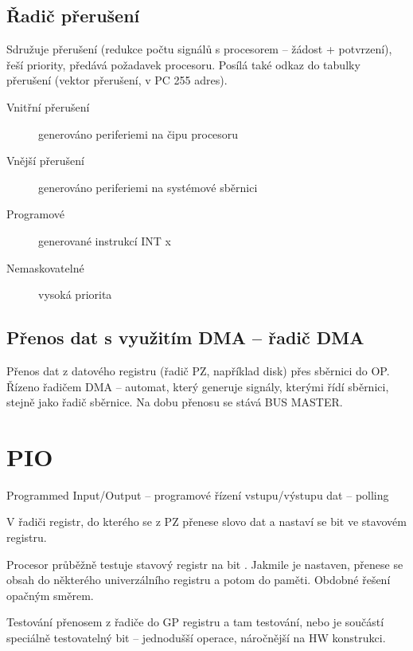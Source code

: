 \documentclass[a4paper, 11pt]{report}
\begin{document}
\subsection{Řadič přerušení}

Sdružuje přerušení (redukce počtu signálů s procesorem -- žádost + potvrzení), řeší priority, předává požadavek procesoru. Posílá také odkaz do tabulky přerušení (vektor přerušení, v PC 255 adres).

\begin{description}
	\item[Vnitřní přerušení] generováno periferiemi na čipu procesoru
	\item[Vnější přerušení] generováno periferiemi na systémové sběrnici
	\item[Programové] generované instrukcí INT x
	\item[Nemaskovatelné] vysoká priorita
\end{description}

\subsection{Přenos dat s využitím DMA -- řadič DMA}
Přenos dat z datového registru (řadič PZ, například disk) přes sběrnici do OP. Řízeno řadičem DMA -- automat, který generuje signály, kterými řídí sběrnici, stejně jako řadič sběrnice. Na dobu přenosu se stává BUS MASTER.

\section{PIO}
Programmed Input/Output -- programové řízení vstupu/výstupu dat -- polling

V řadiči registr, do kterého se z PZ přenese slovo dat a nastaví se bit  ve stavovém registru.

Procesor průběžně testuje stavový registr na bit . Jakmile je nastaven, přenese se obsah do některého univerzálního registru a potom do paměti. Obdobné řešení opačným směrem.

Testování přenosem z řadiče do GP registru a tam testování, nebo je součástí speciálně testovatelný bit -- jednodušší operace, náročnější na HW konstrukci.
\end{document}
